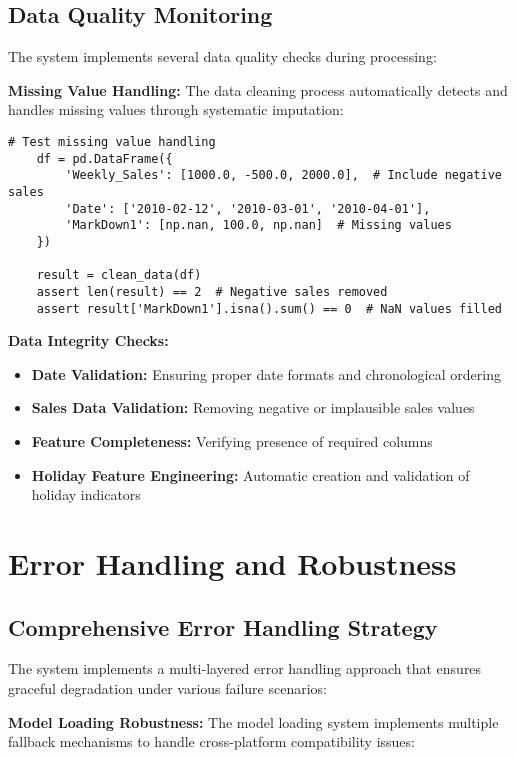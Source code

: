 \subsection{Data Quality Monitoring}

The system implements several data quality checks during processing:

\textbf{Missing Value Handling:}
The data cleaning process automatically detects and handles missing values through systematic imputation:
\begin{lstlisting}[language=MyPython, caption={Data Quality Validation Test}]
	# Test missing value handling
	df = pd.DataFrame({
		'Weekly_Sales': [1000.0, -500.0, 2000.0],  # Include negative sales
		'Date': ['2010-02-12', '2010-03-01', '2010-04-01'],
		'MarkDown1': [np.nan, 100.0, np.nan]  # Missing values
	})
	
	result = clean_data(df)
	assert len(result) == 2  # Negative sales removed
	assert result['MarkDown1'].isna().sum() == 0  # NaN values filled
\end{lstlisting}

\textbf{Data Integrity Checks:}
\begin{itemize}
	\item \textbf{Date Validation:} Ensuring proper date formats and chronological ordering
	\item \textbf{Sales Data Validation:} Removing negative or implausible sales values
	\item \textbf{Feature Completeness:} Verifying presence of required columns
	\item \textbf{Holiday Feature Engineering:} Automatic creation and validation of holiday indicators
\end{itemize}

\section{Error Handling and Robustness}

\subsection{Comprehensive Error Handling Strategy}

The system implements a multi-layered error handling approach that ensures graceful degradation under various failure scenarios:

\textbf{Model Loading Robustness:}
The model loading system implements multiple fallback mechanisms to handle cross-platform compatibility issues:

